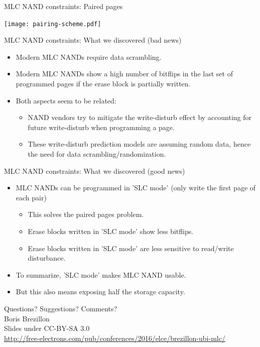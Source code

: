 \documentclass[aspectratio=169,obeyspaces,spaces,hyphens,dvipsnames]{beamer}
\begin{document}
\begin{frame}{MLC NAND constraints: Paired pages}
  \begin{center}
    \texttt{[image: pairing-scheme.pdf]}
  \end{center}
\end{frame}

\begin{frame}{MLC NAND constraints: What we discovered (bad news)}
  \begin{itemize}
  \item Modern MLC NANDs require data scrambling.
  \item Modern MLC NANDs show a high number of bitflips in the last
	set of programmed pages if the erase block is partially
	written.
  \item Both aspects seem to be related:
    \begin{itemize}
    \item NAND vendors try to mitigate the write-disturb effect by
	  accounting for future write-disturb when programming a page.
    \item These write-disturb prediction models are assuming random
	  data, hence the need for data scrambling/randomization.
    \end{itemize}
  \end{itemize}
\end{frame}

\begin{frame}{MLC NAND constraints: What we discovered (good news)}
  \begin{itemize}
  \item MLC NANDs can be programmed in 'SLC mode' (only write the first
	page of each pair)
    \begin{itemize}
    \item This solves the paired pages problem.
    \item Erase blocks written in 'SLC mode' show less bitflips.
    \item Erase blocks written in 'SLC mode' are less sensitive to
	  read/write disturbance.
    \end{itemize}
  \item To summarize, 'SLC mode' makes MLC NAND usable.
  \item But this also means exposing half the storage capacity.
  \end{itemize}
\end{frame}

\begin{frame}
  \begin{center}
  \Huge
  Questions? Suggestions? Comments?\\
  \vspace{1.5cm}
  \huge
  Boris Brezillon\\
  \large
  \vspace{0.5cm}
  \vspace{0.5cm}
  \newline Slides under CC-BY-SA 3.0\\
  \scriptsize
  \url{http://free-electrons.com/pub/conferences/2016/elce/brezillon-ubi-mlc/}
  \end{center}
\end{frame}
\end{document}
